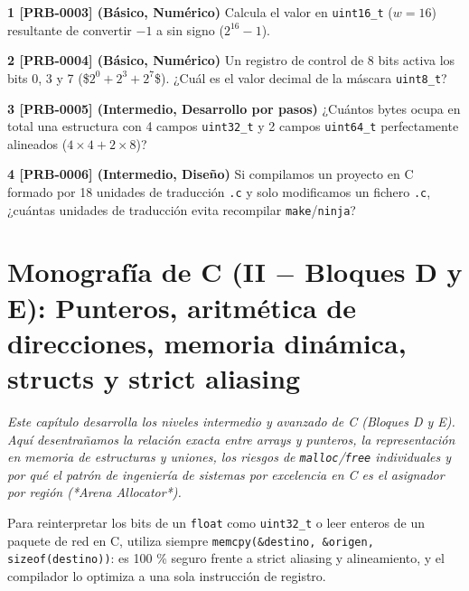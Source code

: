 \documentclass{book}
\begin{document}
\begin{tcolorbox}[title={Ejercicios}, studiumworked, breakable]

\noindent\textbf{1 [PRB-0003] (Básico, Numérico)}
Calcula el valor en \texttt{uint16\_t} (\(w = 16\)) resultante de convertir \(-1\) a sin signo (\(2^{16} - 1\)).

\noindent\textbf{2 [PRB-0004] (Básico, Numérico)}
Un registro de control de 8 bits activa los bits 0, 3 y 7 (\$\(2^0 + 2^3 + 2^7\)\$). ¿Cuál es el valor decimal de la máscara \texttt{uint8\_t}?

\noindent\textbf{3 [PRB-0005] (Intermedio, Desarrollo por pasos)}
¿Cuántos bytes ocupa en total una estructura con 4 campos \texttt{uint32\_t} y 2 campos \texttt{uint64\_t} perfectamente alineados (\(4 \times 4 + 2 \times 8\))?

\noindent\textbf{4 [PRB-0006] (Intermedio, Diseño)}
Si compilamos un proyecto en C formado por 18 unidades de traducción \texttt{.c} y solo modificamos un fichero \texttt{.c}, ¿cuántas unidades de traducción evita recompilar \texttt{make}/\texttt{ninja}?
\end{tcolorbox}

\chapter{Monografía de C (II \(-\) Bloques D y E): Punteros, aritmética de direcciones, memoria dinámica, structs y strict aliasing}
\label{chap:cap02-c-punteros-memoria-dinamica-estructuras-aliasing}

\noindent\textit{Este capítulo desarrolla los niveles intermedio y avanzado de C (Bloques D y E). Aquí desentrañamos la relación exacta entre arrays y punteros, la representación en memoria de estructuras y uniones, los riesgos de \texttt{malloc}/\texttt{free} individuales y por qué el patrón de ingeniería de sistemas por excelencia en C es el asignador por región (*Arena Allocator*).}

\begin{tcolorbox}[title={Consejo}, studiumtip, breakable]

Para reinterpretar los bits de un \texttt{float} como \texttt{uint32\_t} o leer enteros de un paquete de red en C, utiliza siempre \texttt{memcpy(\&destino, \&origen, sizeof(destino))}: es 100 \% seguro frente a strict aliasing y alineamiento, y el compilador lo optimiza a una sola instrucción de registro.
\end{tcolorbox}
\end{document}

